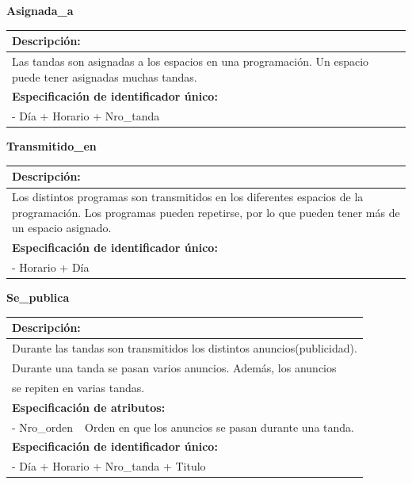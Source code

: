 \documentclass[a4paper,10pt]{article}
\begin{document}
    \begin{flushleft}
      \begin{large} \bf{Asignada\_a} \end{large}
    \end{flushleft}
      \begin{tabular}{| p{11.4cm} |}
	\hline
	\bf{Descripci\'on:} \\
	\hline
	Las tandas son asignadas a los espacios en una programaci\'on. Un espacio puede tener asignadas muchas tandas. \\	
	\hline	
	\bf{Especificaci\'on de identificador \'unico:} \\
	\hline
	- D\'ia + Horario + Nro\_tanda \\
	\hline
      \end{tabular} 
   
    \begin{flushleft}
      \begin{large} \bf{Transmitido\_en} \end{large}
    \end{flushleft}
      \begin{tabular}{| p{11.4cm} |}
	\hline
	\bf{Descripci\'on:} \\
	\hline
	Los distintos programas son transmitidos en los diferentes espacios de la programaci\'on. Los programas pueden repetirse, por lo que pueden tener m\'as de un espacio asignado. \\	
	\hline
	\bf{Especificaci\'on de identificador \'unico:} \\
	\hline
	- Horario + D\'ia\\
	\hline
      \end{tabular}
       
    \begin{flushleft}
      \begin{large} \bf{Se\_publica} \end{large}
    \end{flushleft}
      \begin{tabular}{| p{2cm} | p{9cm} |}
	\hline
	\multicolumn{2}{|l|}{\bf{Descripci\'on:}} \\
	\hline
	\multicolumn{2}{|l|}{Durante las tandas son transmitidos los distintos anuncios(publicidad).} \\
	\multicolumn{2}{|l|}{Durante una tanda se pasan varios anuncios. Adem\'as, los anuncios } \\	
	\multicolumn{2}{|l|}{se repiten en varias tandas.} \\
	\hline
	\multicolumn{2}{|l|}{\bf{Especificaci\'on de atributos:}} \\
	\hline
	- Nro\_orden & Orden en que los anuncios se pasan durante una tanda. \\
	\hline
	\multicolumn{2}{|l|}{\bf{Especificaci\'on de identificador \'unico:}} \\
	\hline
	\multicolumn{2}{|l|}{- D\'ia + Horario + Nro\_tanda + Titulo} \\
	\hline
      \end{tabular}
\end{document}
